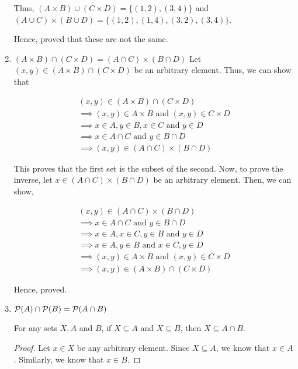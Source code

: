 \begin{enumerate}
	      Thus, $(A \times B) \cup (C \times D) = \{(1, 2), (3, 4)\}$ and
	      $(A \cup C) \times (B \cup D) = \{(1, 2),(1, 4), (3, 2), (3, 4)\}$.

	      Hence, proved that these are not the same.
	      \es

	\item $(A \times B) \cap (C \times D) = (A \cap C) \times (B \cap D)$ \label{cart-inter}
	      \bs
	      Let $(x, y) \in (A \times B) \cap (C \times D)$ be an arbitrary element. Thus, we can show that

	      \begin{align}
		      (x, y) \in (A \times B) \cap (C \times D)                         \\
		      \implies (x, y) \in A \times B \text{ and } (x, y) \in C \times D \\
		      \implies x \in A, y \in B, x \in C \text{ and } y \in D           \\
		      \implies x \in A \cap C \text{ and } y \in B \cap D               \\
		      \implies (x, y) \in (A \cap C) \times (B \cap D)
	      \end{align}

	      This proves that the first set is the subset of the second.
	      Now, to prove the inverse, let $x \in (A \cap C) \times (B \cap D)$ be an arbitrary element. Then, we can show,

	      \begin{align}
		      (x, y) \in (A \cap C) \times (B \cap D)                           \\
		      \implies x \in A \cap C \text{ and } y \in B \cap D               \\
		      \implies x \in A, x \in C, y \in B \text{ and } y \in D           \\
		      \implies x \in A, y \in B \text{ and } x \in C, y \in D           \\
		      \implies (x, y) \in A \times B \text{ and } (x, y) \in C \times D \\
		      \implies (x, y) \in (A \times B) \cap (C \times D)
	      \end{align}

	      Hence, proved.
	      \es


	\item $\mathcal{P}(A) \cap \mathcal{P}(B) = \mathcal{P}(A \cap B)$
	      \bs
	      \begin{lemma}\label{intersub}
		      For any sets $X, A$ and $B$, if $X \subseteq A$ and $X \subseteq B$, then $X \subseteq A \cap B$.
	      \end{lemma}
	      \begin{proof}
		      Let $x \in X$ be any arbitrary element.
		      Since $X \subseteq A$, we know that $x \in A$.
		      Similarly, we know that $x \in B$.


\end{proof}
\end{enumerate}
